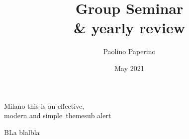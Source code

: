 \documentclass[11pt,xcolor={dvipsnames}]{beamer}
\title{Group Seminar\\ \& yearly review}
\author{Paolino Paperino}
\institute
{Group of {\bfseries Donald Duck}, \\ University of Paperopoli
}
\date{May 2021}
\begin{document}
\maketitle 
\begin{frame}{Milano this is an effective,\\modern and simple\ theme}{sub}
\alert{alert}
\begin{block}{BLa}
	blalbla
\end{block}
\end{frame}
\end{document}
